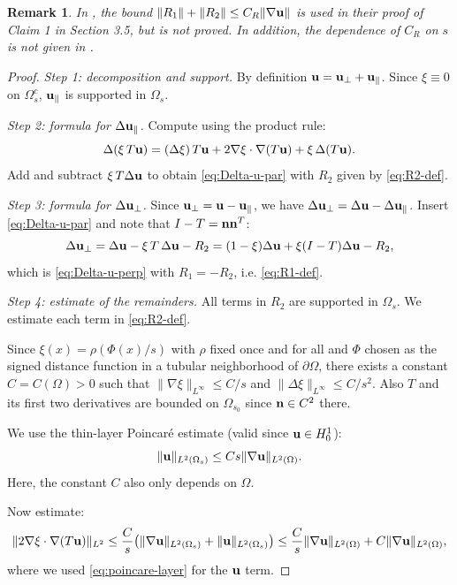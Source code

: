 \documentclass{article}
\newtheorem{remark}[theorem]{Remark}
\theoremstyle{definition}                   %
\begin{document}
\begin{remark}
In \cite{LiuLiuPego2007}, the bound $\|R_1\| + \|R_2\| \le C_R \|\nabla{\bf u}\|$ is used in their proof of Claim 1 in Section 3.5, but is not proved. In addition,  the dependence of $C_R$ on $s$ is not given in \cite{LiuLiuPego2007}.
\end{remark}

\begin{proof}
\emph{Step 1: decomposition and support.}
By definition ${\bf u}={\bf u}_\perp+{\bf u}_\parallel$.
Since $\xi\equiv 0$ on $\Omega_s^c$, ${\bf u}_\parallel$ is supported in $\Omega_s$.

\emph{Step 2: formula for $\Delta{\bf u}_\parallel$.}
Compute using the product rule:
\[
\Delta(\xi\,T{\bf u})
=
(\Delta\xi)\,T{\bf u}
+2\nabla\xi\cdot\nabla(T{\bf u})
+\xi\,\Delta(T{\bf u}).
\]
Add and subtract $\xi\,T\Delta{\bf u}$ to obtain \eqref{eq:Delta-u-par} with
$R_2$ given by \eqref{eq:R2-def}.

\emph{Step 3: formula for $\Delta{\bf u}_\perp$.}
Since ${\bf u}_\perp={\bf u}-{\bf u}_\parallel$, we have
$\Delta{\bf u}_\perp=\Delta{\bf u}-\Delta{\bf u}_\parallel$.
Insert \eqref{eq:Delta-u-par} and note that $I-T={\bf n}{\bf n}^T$:
\[
\Delta{\bf u}_\perp
=
\Delta{\bf u}-\xi\,T\,\Delta{\bf u}-R_2
=
(1-\xi)\Delta{\bf u}+\xi(I-T)\Delta{\bf u}-R_2,
\]
which is \eqref{eq:Delta-u-perp} with $R_1=-R_2$, i.e. \eqref{eq:R1-def}.

\emph{Step 4: estimate of the remainders.}
All terms in $R_2$ are supported in $\Omega_s$. We estimate each term in
\eqref{eq:R2-def}.

Since $\xi(x)=\rho(\Phi(x)/s)$ with $\rho$ fixed once and for all and $\Phi$ chosen
as the signed distance function in a tubular neighborhood of $\partial\Omega$,
there exists a constant $C=C(\Omega)>0$ such that
$\|\nabla\xi\|_{L^\infty}\le C/s$ and $\|\Delta\xi\|_{L^\infty}\le C/s^2$.
Also $T$ and its first two derivatives are bounded on $\Omega_{s_0}$ since
${\bf n}\in C^2$ there.

We use the thin-layer Poincar\'e estimate (valid since ${\bf u}\in H^1_0$):
\begin{equation}\label{eq:poincare-layer}
\|{\bf u}\|_{L^2(\Omega_s)} \le C s \|\nabla{\bf u}\|_{L^2(\Omega)}.
\end{equation}
Here, the constant $C$ also only depends on $\Omega$. 


Now estimate:
\[
\|2\nabla\xi\cdot\nabla(T{\bf u})\|_{L^2}
\le \frac{C}{s}\bigl(\|\nabla{\bf u}\|_{L^2(\Omega_s)}+\|{\bf u}\|_{L^2(\Omega_s)}\bigr)
\le \frac{C}{s}\|\nabla{\bf u}\|_{L^2(\Omega)} + C\|\nabla{\bf u}\|_{L^2(\Omega)},
\]
where we used \eqref{eq:poincare-layer} for the ${\bf u}$ term.


\end{proof}
\end{document}
